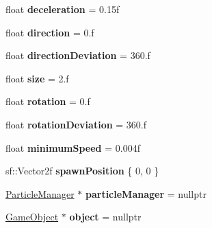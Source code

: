 \begin{DoxyCompactItemize}
\item 
\hypertarget{class_particle_emitter_a0659c3d423516551eb2bccabd5118d98}{float {\bfseries deceleration} = 0.\+15f}\label{class_particle_emitter_a0659c3d423516551eb2bccabd5118d98}

\item 
\hypertarget{class_particle_emitter_af330001a636059db3f7fea0c0d5a0fdf}{float {\bfseries direction} = 0.f}\label{class_particle_emitter_af330001a636059db3f7fea0c0d5a0fdf}

\item 
\hypertarget{class_particle_emitter_ab5cee07d425137bc979058bed2fc7b91}{float {\bfseries direction\+Deviation} = 360.f}\label{class_particle_emitter_ab5cee07d425137bc979058bed2fc7b91}

\item 
\hypertarget{class_particle_emitter_a36dcead124ad38150b8f21feda7115d8}{float {\bfseries size} = 2.f}\label{class_particle_emitter_a36dcead124ad38150b8f21feda7115d8}

\item 
\hypertarget{class_particle_emitter_aef5ed3707677d9fdf0e411276a8be6ab}{float {\bfseries rotation} = 0.f}\label{class_particle_emitter_aef5ed3707677d9fdf0e411276a8be6ab}

\item 
\hypertarget{class_particle_emitter_a2ccd7416ae393bace934fe2b415f64cf}{float {\bfseries rotation\+Deviation} = 360.f}\label{class_particle_emitter_a2ccd7416ae393bace934fe2b415f64cf}

\item 
\hypertarget{class_particle_emitter_a6618d5435d8fe332e26656c20aecb7a6}{float {\bfseries minimum\+Speed} = 0.\+004f}\label{class_particle_emitter_a6618d5435d8fe332e26656c20aecb7a6}

\item 
\hypertarget{class_particle_emitter_ae43520e60f9102c9626f110090830ae1}{sf\+::\+Vector2f {\bfseries spawn\+Position} \{ 0, 0 \}}\label{class_particle_emitter_ae43520e60f9102c9626f110090830ae1}

\item 
\hypertarget{class_particle_emitter_ac89ef51ef2739ef7bc39461b6d4e3d17}{\hyperlink{class_particle_manager}{Particle\+Manager} $\ast$ {\bfseries particle\+Manager} = nullptr}\label{class_particle_emitter_ac89ef51ef2739ef7bc39461b6d4e3d17}

\item 
\hypertarget{class_particle_emitter_a558c0bd0ad1193482111782f488cadb2}{\hyperlink{class_game_object}{Game\+Object} $\ast$ {\bfseries object} = nullptr}\label{class_particle_emitter_a558c0bd0ad1193482111782f488cadb2}

\end{DoxyCompactItemize}


